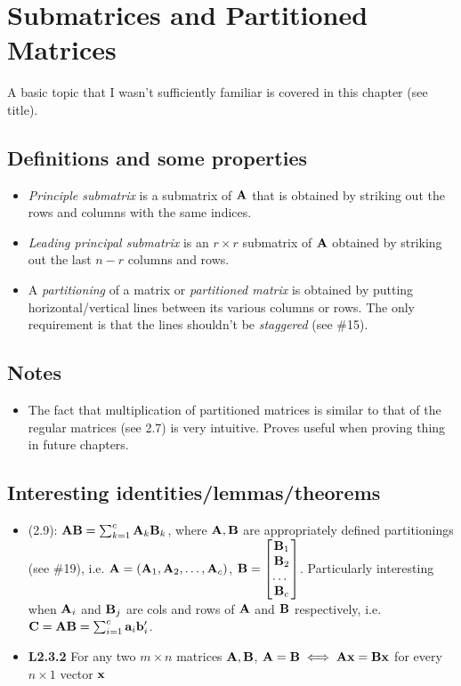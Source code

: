 \documentclass[a4paper, oneside]{book}
\begin{document}
\chapter{Submatrices and Partitioned Matrices}
A basic topic that I wasn't sufficiently familiar is covered in this chapter (see title). 

\section{Definitions and some properties}
\begin{itemize}
\item \textit{Principle submatrix} is a submatrix of $\mathbf A$ that is obtained by striking out the rows and columns with the same indices.
\item \textit{Leading principal submatrix} is an $r\times r$ submatrix of $\mathbf A$ obtained by striking out the last $n-r$ columns and rows.
\item A \textit{partitioning} of a matrix or \textit{partitioned matrix} is obtained by putting horizontal/vertical lines between its various columns or rows. The only requirement is that the lines shouldn't be \textit{staggered} (see \#15). 
\end{itemize}

\section*{Notes}
\begin{itemize}
\item The fact that multiplication of partitioned matrices is similar to that of the regular matrices (see 2.7) is very intuitive. Proves useful when proving thing in future chapters.
\end{itemize}

\section*{Interesting identities/lemmas/theorems}

\begin{itemize}
\item (2.9): $\mathbf{AB} = \sum_{k=1}^c \mathbf{A}_k \mathbf{B}_k$, where $\mathbf{A,B}$ are appropriately defined partitionings (see \#19), i.e. $\mathbf{A} = \left(\mathbf{A}_1, \mathbf{A}_2, \hdots, \mathbf{A}_c \right)$, $\mathbf B=\begin{bmatrix} \mathbf{B}_1\\ \mathbf{B}_2\\ \hdots\ \\ \mathbf{B}_c \end{bmatrix}$. Particularly interesting when $\mathbf{A}_i$ and $\mathbf{B}_j$ are cols and rows of $\mathbf A$ and $\mathbf B$ respectively, i.e. $\mathbf{C}=\mathbf{A}\mathbf{B}=\sum_{i=1}^c \mathbf{a}_i\mathbf{b}'_i$.
\item \textbf{L2.3.2} For any two $m\times n$ matrices $ \mathbf{A,B}$, $\mathbf A = \mathbf B \iff \mathbf{Ax = Bx}$ for every $n\times 1$ vector $\mathbf x$
\end{itemize}
\end{document}
